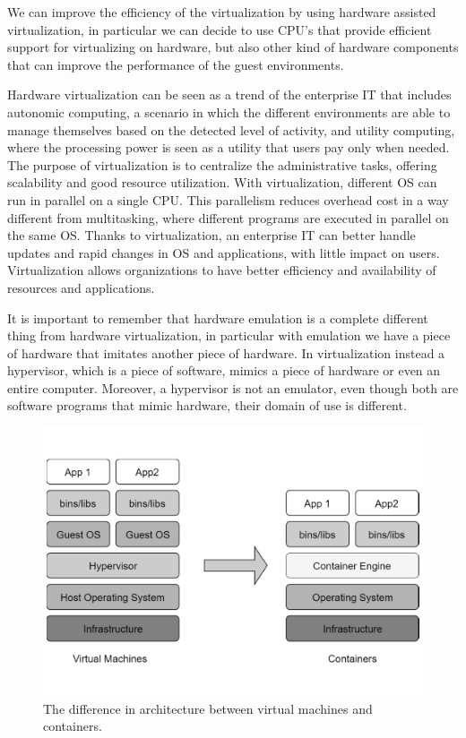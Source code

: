 We can improve the efficiency of the virtualization by using hardware assisted virtualization, in particular we can decide to use CPU's that provide efficient support for virtualizing on hardware, but also other kind of hardware components that can improve the performance of the guest environments.

Hardware virtualization can be seen as a trend of the enterprise IT that includes autonomic computing, a scenario in which the different environments are able to manage themselves based on the detected level of activity, and utility computing, where the processing power is seen
as a utility that users pay only when needed. The purpose of virtualization is to centralize the administrative tasks, offering scalability and good resource utilization. With virtualization, different OS can run in parallel on a single CPU. This parallelism reduces overhead cost in a way different from multitasking, where different programs are executed in parallel on the same OS. Thanks to virtualization, an enterprise IT can better handle updates and rapid changes in OS and applications, with little impact on users. Virtualization allows organizations to have better efficiency and availability of resources and applications.

It is important to remember that hardware emulation is a complete different thing from hardware virtualization, in particular with emulation we have a piece of hardware that imitates another piece of hardware. In virtualization instead a hypervisor, which is a piece of software, mimics a piece of hardware or even an entire computer. Moreover, a hypervisor is not an emulator, even though both are software programs that mimic hardware, their domain of use is different.
\begin{figure}
	\centering
	\includegraphics[width=\columnwidth]{Images/vm_vs_container.pdf}  
	\caption[Architecture of virtual machines and containers]{The difference in  architecture between virtual machines and containers.}
	\label{fig:vmVsContainer}
\end{figure}

